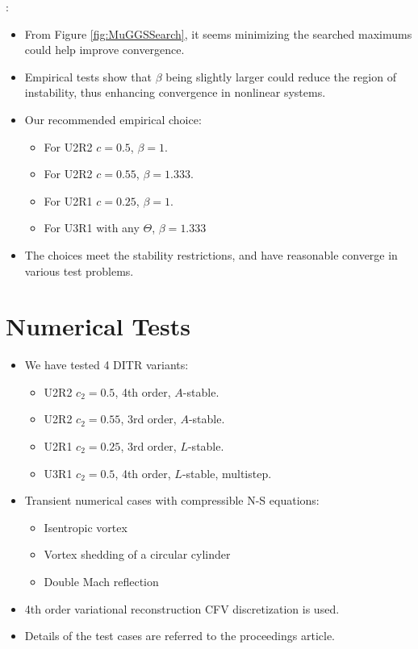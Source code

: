 \documentclass[aspectratio=169,serif]{beamer} %
\begin{document}
\begin{frame}{\secname: \subsecname}
  \small
  \begin{itemize}
    \item From Figure \ref{fig:MuGGSSearch}, it seems minimizing
          the searched maximums could help improve convergence.
    \item Empirical tests show that $\beta$ being slightly larger
          could reduce the region of instability, thus enhancing
          convergence in nonlinear systems.
    \item Our recommended empirical choice:
          \begin{itemize}
            \item For U2R2 $c=0.5$, $\beta = 1$.
            \item For U2R2 $c=0.55$, $\beta = 1.333$.
            \item For U2R1 $c=0.25$, $\beta = 1$.
            \item For U3R1 with any $\Theta$, $\beta = 1.333$
          \end{itemize}
    \item The choices meet the stability restrictions,
          and have reasonable converge in various test problems.
  \end{itemize}
\end{frame}

\section{Numerical Tests}

\begin{frame}{\secname}
  \begin{itemize}
    \item We have tested 4 DITR variants:
          \begin{itemize}
            \item U2R2 $c_2=0.5$, 4th order, $A$-stable.
            \item U2R2 $c_2=0.55$, 3rd order, $A$-stable.
            \item U2R1 $c_2=0.25$, 3rd order, $L$-stable.
            \item U3R1 $c_2=0.5$, 4th order, $L$-stable, multistep.
          \end{itemize}
    \item Transient numerical cases with compressible N-S equations:
          \begin{itemize}
            \item Isentropic vortex
            \item Vortex shedding of a circular cylinder
            \item Double Mach reflection
          \end{itemize}
    \item 4th order variational reconstruction CFV discretization is used.
    \item Details of the test cases are referred to the proceedings article.
  \end{itemize}
\end{frame}
\end{document}
